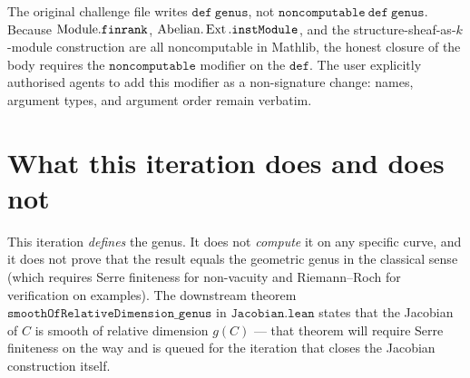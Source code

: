The original challenge file writes \(\mathtt{def\ genus}\), not \(\mathtt{noncomputable\ def\ genus}\). Because \(\mathrm{Module}.\mathtt{finrank}\), \(\mathrm{Abelian}.\operatorname{Ext}.\mathtt{instModule}\), and the structure-sheaf-as-\(k\)-module construction are all noncomputable in Mathlib, the honest closure of the body requires the \(\mathtt{noncomputable}\) modifier on the \(\mathtt{def}\). The user explicitly authorised agents to add this modifier as a non-signature change: names, argument types, and argument order remain verbatim.

\section{What this iteration does and does not}

This iteration \emph{defines} the genus. It does not \emph{compute} it on any specific curve, and it does not prove that the result equals the geometric genus in the classical sense (which requires Serre finiteness for non-vacuity and Riemann--Roch for verification on examples). The downstream theorem \(\mathtt{smoothOfRelativeDimension\_genus}\) in \(\mathtt{Jacobian.lean}\) states that the Jacobian of \(C\) is smooth of relative dimension \(g(C)\) --- that theorem will require Serre finiteness on the way and is queued for the iteration that closes the Jacobian construction itself.
